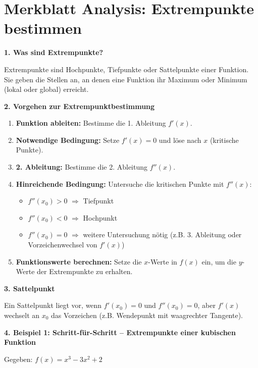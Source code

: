 \section*{Merkblatt Analysis: Extrempunkte bestimmen}

\textbf{1. Was sind Extrempunkte?}

Extrempunkte sind Hochpunkte, Tiefpunkte oder Sattelpunkte einer Funktion. Sie geben die Stellen an, an denen eine Funktion ihr Maximum oder Minimum (lokal oder global) erreicht.

\vspace{0.5em}

\textbf{2. Vorgehen zur Extrempunktbestimmung}

\begin{enumerate}
    \item \textbf{Funktion ableiten:} Bestimme die 1. Ableitung $f'(x)$.
    \item \textbf{Notwendige Bedingung:} Setze $f'(x) = 0$ und löse nach $x$ (kritische Punkte).
    \item \textbf{2. Ableitung:} Bestimme die 2. Ableitung $f''(x)$.
    \item \textbf{Hinreichende Bedingung:} Untersuche die kritischen Punkte mit $f''(x)$:
    \begin{itemize}
        \item $f''(x_0) > 0$ $\Rightarrow$ Tiefpunkt
        \item $f''(x_0) < 0$ $\Rightarrow$ Hochpunkt
        \item $f''(x_0) = 0$ $\Rightarrow$ weitere Untersuchung nötig (z.B. 3. Ableitung oder Vorzeichenwechsel von $f'(x)$)
    \end{itemize}
    \item \textbf{Funktionswerte berechnen:} Setze die $x$-Werte in $f(x)$ ein, um die $y$-Werte der Extrempunkte zu erhalten.
\end{enumerate}

\vspace{0.5em}

\textbf{3. Sattelpunkt}

Ein Sattelpunkt liegt vor, wenn $f'(x_0) = 0$ und $f''(x_0) = 0$, aber $f'(x)$ wechselt an $x_0$ das Vorzeichen (z.B. Wendepunkt mit waagrechter Tangente).

\vspace{0.5em}

\textbf{4. Beispiel 1: Schritt-für-Schritt – Extrempunkte einer kubischen Funktion}

Gegeben: $f(x) = x^3 - 3x^2 + 2$

